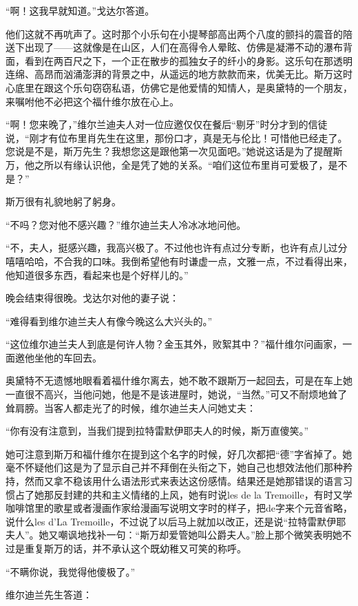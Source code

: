 \par “啊！这我早就知道。”戈达尔答道。
\par 他们这就不再吭声了。这时那个小乐句在小提琴部高出两个八度的颤抖的震音的陪送下出现了——这就像是在山区，人们在高得令人晕眩、仿佛是凝滞不动的瀑布背面，看到在两百尺之下，一个正在散步的孤独女子的纤小的身影。这乐句在那透明连绵、高昂而汹涌澎湃的背景之中，从遥远的地方款款而来，优美无比。斯万这时心底里在跟这个乐句窃窃私语，仿佛它是他爱情的知情人，是奥黛特的一个朋友，来嘱咐他不必把这个福什维尔放在心上。
\par “啊！您来晚了，”维尔兰迪夫人对一位应邀仅仅在餐后“剔牙”时分才到的信徒说，“刚才有位布里肖先生在这里，那份口才，真是无与伦比！可惜他已经走了。您说是不是，斯万先生？我想您这是跟他第一次见面吧。”她说这话是为了提醒斯万，他之所以有缘认识他，全是凭了她的关系。“咱们这位布里肖可爱极了，是不是？”
\par 斯万很有礼貌地躬了躬身。
\par “不吗？您对他不感兴趣？”维尔迪兰夫人冷冰冰地问他。
\par “不，夫人，挺感兴趣，我高兴极了。不过他也许有点过分专断，也许有点儿过分嘻嘻哈哈，不合我的口味。我倒希望他有时谦虚一点，文雅一点，不过看得出来，他知道很多东西，看起来也是个好样儿的。”
\par 晚会结束得很晚。戈达尔对他的妻子说：
\par “难得看到维尔迪兰夫人有像今晚这么大兴头的。”
\par “这位维尔迪兰夫人到底是何许人物？金玉其外，败絮其中？”福什维尔问画家，一面邀他坐他的车回去。
\par 奥黛特不无遗憾地眼看着福什维尔离去，她不敢不跟斯万一起回去，可是在车上她一直很不高兴，当他问她，他是不是该进屋时，她说，“当然。”可又不耐烦地耸了耸肩膀。当客人都走光了的时候，维尔迪兰夫人问她丈夫：
\par “你有没有注意到，当我们提到拉特雷默伊耶夫人的时候，斯万直傻笑。”
\par 她可注意到斯万和福什维尔在提到这个名字的时候，好几次都把“德”字省掉了。她毫不怀疑他们这是为了显示自己并不拜倒在头衔之下，她自己也想效法他们那种矜持，然而又拿不稳该用什么语法形式来表达这份感情。结果还是她那错误的语言习惯占了她那反封建的共和主义情绪的上风，她有时说les de la Tremoille，有时又学咖啡馆里的歌星或者漫画作家给漫画写说明文字时的样子，把de字来个元音省略，说什么les d’La Tremoille，不过说了以后马上就加以改正，还是说“拉特雷默伊耶夫人”。她又嘲讽地找补一句：“斯万却爱管她叫公爵夫人。”脸上那个微笑表明她不过是重复斯万的话，并不承认这个既幼稚又可笑的称呼。
\par “不瞒你说，我觉得他傻极了。”
\par 维尔迪兰先生答道：
